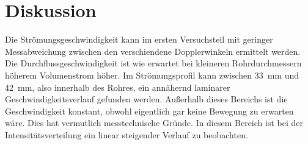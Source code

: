 \section{Diskussion}
\label{sec:Diskussion}

Die Strömungsgeschwindigkeit kann im ersten Versuchsteil mit geringer Messabweichung zwischen den verschiendene Dopplerwinkeln ermittelt werden. Die Durchflussgeschwindigkeit ist wie erwartet bei kleineren Rohrdurchmessern höherem Volumenstrom höher.
Im Strömungsprofil kann zwischen \SI{33}{mm} und \SI{42}{mm}, also innerhalb des Rohres, ein annähernd laminarer Geschwindigkeitsverlauf gefunden werden. Außerhalb dieses Bereichs ist die Geschwindigkeit konstant, obwohl eigentlich gar keine Bewegung zu erwarten wäre. Dies hat vermutlich messtechnische Gründe. In diesem Bereich ist bei der Intensitätsverteilung ein linear steigender Verlauf zu beobachten.
